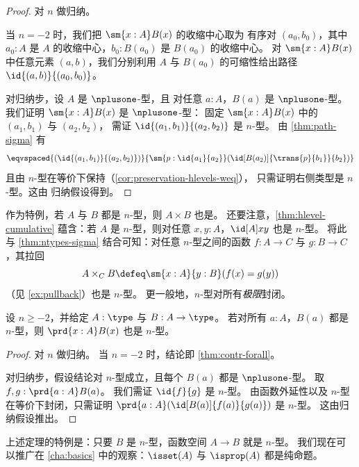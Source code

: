\begin{proof}
 对 $n$ 做归纳。

 当 $n = -2$ 时，我们把 $\sm{x : A} B(x)$ 的收缩中心取为
       有序对 $(a_0, b_0)$，其中 $a_0 : A$ 是 $A$ 的收缩中心，$b_0 : B(a_0)$ 是 $B(a_0)$ 的收缩中心。
       对 $\sm{x : A} B(x)$ 中任意元素 $(a,b)$，我们分别利用 $A$ 与 $B(a_0)$ 的可缩性给出路径
       $\id{(a, b)}{(a_0,b_0)}$。

 对归纳步，设 $A$ 是 $\nplusone$-型，且
         对任意 $a : A$，$B(a)$ 是 $\nplusone$-型。我们证明 $\sm{x : A} B(x)$ 是 $\nplusone$-型：
      固定 $\sm{x : A} B(x)$ 中的 $(a_1, b_1)$ 与 $(a_2,b_2)$，
     需证 $\id{(a_1, b_1)}{(a_2,b_2)}$ 是 $n$-型。
      由 \cref{thm:path-sigma} 有
      \[ \eqvspaced{(\id{(a_1, b_1)}{(a_2,b_2)})}{\sm{p : \id{a_1}{a_2}} (\id[B(a_2)]{\trans{p}{b_1}}{b_2})} \]
   且由 $n$-型在等价下保持（\cref{cor:preservation-hlevels-weq}），
   只需证明右侧类型是 $n$-型。这由
   归纳假设得到。
\end{proof}

作为特例，若 $A$ 与 $B$ 都是 $n$-型，则 $A\times B$ 也是。
还要注意，\cref{thm:hlevel-cumulative} 蕴含：若 $A$ 是 $n$-型，则对任意 $x,y:A$，$\id[A]xy$ 也是 $n$-型。
将此与 \cref{thm:ntypes-sigma} 结合可知：对任意 $n$-型之间的函数 $f:A\to C$ 与 $g:B\to C$，其拉回
\[ A\times_C B \defeq \sm{x:A}{y:B} (f(x)=g(y)) \]
（见 \cref{ex:pullback}）也是 $n$-型。
更一般地，$n$-型对所有\emph{极限}封闭。

\begin{thm}\label{thm:hlevel-prod}
 设 $n\geq -2$，并给定 $A : \type$ 与 $B : A \to \type$。
 若对所有 $a : A$，$B(a)$ 都是 $n$-型，则 $\prd{x : A} B(x)$ 也是 $n$-型。
\end{thm}

\begin{proof}
  对 $n$ 做归纳。
  当 $n = -2$ 时，结论即 \cref{thm:contr-forall}。

  对归纳步，假设结论对 $n$-型成立，且每个 $B(a)$ 都是 $\nplusone$-型。
  取 $f, g : \prd{a:A}B(a)$。
  我们需证 $\id{f}{g}$ 是 $n$-型。
  由函数外延性以及 $n$-型在等价下封闭，只需证明 $\prd{a : A} (\id[B(a)]{f(a)}{g(a)})$ 是 $n$-型。
  这由归纳假设推出。
\end{proof}

上述定理的特例是：只要 $B$ 是 $n$-型，函数空间 $A \to B$ 就是 $n$-型。
我们现在可以推广在 \cref{cha:basics} 中的观察：$\isset(A)$ 与 $\isprop(A)$ 都是纯命题。


